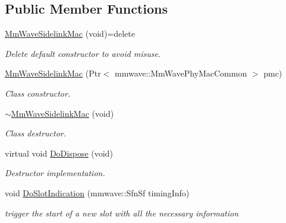 \subsection*{Public Member Functions}
\begin{DoxyCompactItemize}
\item 
\mbox{\label{classns3_1_1millicar_1_1MmWaveSidelinkMac_a2c96de8928cbba2b7c8b0f71f2318e54}} 
\hyperlink{classns3_1_1millicar_1_1MmWaveSidelinkMac_a2c96de8928cbba2b7c8b0f71f2318e54}{Mm\+Wave\+Sidelink\+Mac} (void)=delete
\begin{DoxyCompactList}\small\item\em Delete default constructor to avoid misuse. \end{DoxyCompactList}\item 
\hyperlink{classns3_1_1millicar_1_1MmWaveSidelinkMac_ae4a82035baa66ee6c17d9b2094bacd24}{Mm\+Wave\+Sidelink\+Mac} (Ptr$<$ mmwave\+::\+Mm\+Wave\+Phy\+Mac\+Common $>$ pmc)
\begin{DoxyCompactList}\small\item\em Class constructor. \end{DoxyCompactList}\item 
\mbox{\label{classns3_1_1millicar_1_1MmWaveSidelinkMac_a8a34b3d135b391d9fc16004fb91fa208}} 
\hyperlink{classns3_1_1millicar_1_1MmWaveSidelinkMac_a8a34b3d135b391d9fc16004fb91fa208}{$\sim$\+Mm\+Wave\+Sidelink\+Mac} (void)
\begin{DoxyCompactList}\small\item\em Class destructor. \end{DoxyCompactList}\item 
\mbox{\label{classns3_1_1millicar_1_1MmWaveSidelinkMac_af5aee81d76bc85ab6d57742cffc214de}} 
virtual void \hyperlink{classns3_1_1millicar_1_1MmWaveSidelinkMac_af5aee81d76bc85ab6d57742cffc214de}{Do\+Dispose} (void)
\begin{DoxyCompactList}\small\item\em Destructor implementation. \end{DoxyCompactList}\item 
void \hyperlink{classns3_1_1millicar_1_1MmWaveSidelinkMac_af1c118a5b92dfce7a7b62c55ac50c020}{Do\+Slot\+Indication} (mmwave\+::\+Sfn\+Sf timing\+Info)
\begin{DoxyCompactList}\small\item\em trigger the start of a new slot with all the necessary information \end{DoxyCompactList}\item 

\end{DoxyCompactItemize}
